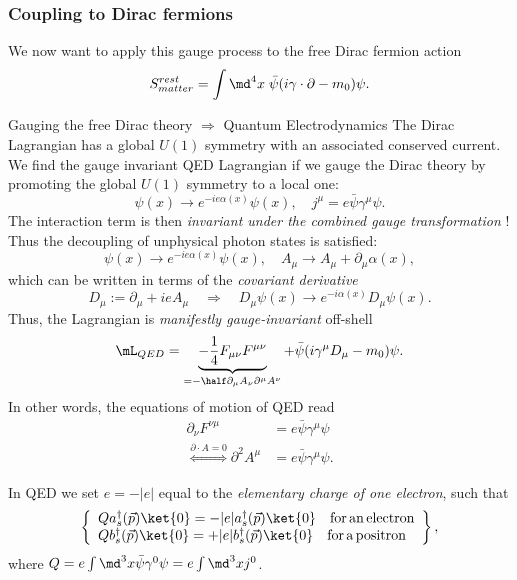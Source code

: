 \subsubsection{Coupling to Dirac fermions}
We now want to apply this gauge process to the free Dirac fermion action
\begin{equation}
	S^{rest}_{matter} = \int \md^4 x \; \bar{\psi} (i \gamma \cdot \partial - m_0 ) \psi.
\end{equation}
\begin{mybox}{Gauging the free Dirac theory $\Rightarrow$ Quantum Electrodynamics}
	The Dirac Lagrangian has a global $U(1)$ symmetry with an associated conserved current. We find the gauge invariant QED Lagrangian if we gauge the Dirac theory by promoting the global $U(1)$ symmetry to a local one:
	\begin{equation}
		\psi(x) \rightarrow e^{-i e \alpha(x)} \psi(x), \quad j^{\mu} = e \bar{\psi} \gamma^{\mu} \psi.
	\end{equation}
	The interaction term is then \emph{invariant under the combined gauge transformation} ! Thus the decoupling of unphysical photon states is satisfied:
	\begin{equation}
		\psi(x) \rightarrow e^{-i e \alpha(x) } \psi(x), \quad A_{\mu} \rightarrow A_{\mu} + \partial_{\mu} \alpha(x),
	\end{equation}
	which can be written in terms of the \emph{covariant derivative}
	\begin{equation}
		D_{\mu} := \partial_{\mu} + i e A_{\mu} \quad \Rightarrow \quad D_{\mu} \psi(x) \rightarrow e^{-i \alpha(x)} D_{\mu} \psi(x).
	\end{equation}
	Thus, the Lagrangian is \emph{manifestly gauge-invariant} off-shell
	\begin{equation}
		\mL_{QED} = \underbrace{- \frac{1}{4} F_{\mu \nu} F^{\mu \nu} }_{=-\half \partial_{\mu} A_{\nu} \partial^{\mu} A^{\nu}} + \bar{\psi} (i \gamma^{\mu} D_{\mu} -m_0) \psi.
	\end{equation}
	In other words, the equations of motion of QED read
	\begin{align}
		\partial_{\nu} F^{\nu \mu} &= e \bar{\psi} \gamma^{\mu} \psi \\
		\stackrel{\partial \cdot A=0}{\Leftrightarrow} \partial^2 A^{\mu} &= e \bar{\psi} \gamma^{\mu} \psi.
	\end{align}
	
\end{mybox}
In QED we set $e=-|e|$ equal to the \emph{elementary charge of one electron}, such that 
\begin{equation}
	\left\{	
	\begin{array}{lr}
	Qa^{\dagger}_s(\vec{p}) \ket{0} =- |e| a^{\dagger}_s(\vec{p}) \ket{0} \quad \mathrm{for \, an \, electron} \\
	Q b^{\dagger}_s(\vec{p}) \ket{0} = + |e| b^{\dagger}_s(\vec{p} ) \ket{0} \quad \mathrm{for \, a \, positron}
	\end{array}
	\right\},
\end{equation}
where $Q=e \int \md^3 x \bar{\psi} \gamma^0 \psi = e \int \md^3 x j^0$.
\\
\\
